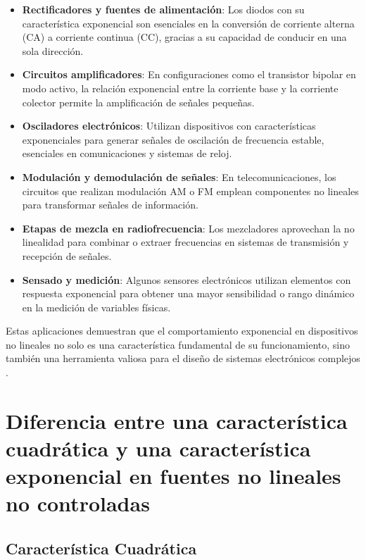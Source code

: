 \begin{itemize}
    \item \textbf{Rectificadores y fuentes de alimentación}: Los diodos con su característica exponencial son esenciales en la conversión de corriente alterna (CA) a corriente continua (CC), gracias a su capacidad de conducir en una sola dirección.
    
    \item \textbf{Circuitos amplificadores}: En configuraciones como el transistor bipolar en modo activo, la relación exponencial entre la corriente base y la corriente colector permite la amplificación de señales pequeñas.
    
    \item \textbf{Osciladores electrónicos}: Utilizan dispositivos con características exponenciales para generar señales de oscilación de frecuencia estable, esenciales en comunicaciones y sistemas de reloj.
    
    \item \textbf{Modulación y demodulación de señales}: En telecomunicaciones, los circuitos que realizan modulación AM o FM emplean componentes no lineales para transformar señales de información.
    
    \item \textbf{Etapas de mezcla en radiofrecuencia}: Los mezcladores aprovechan la no linealidad para combinar o extraer frecuencias en sistemas de transmisión y recepción de señales.
    
    \item \textbf{Sensado y medición}: Algunos sensores electrónicos utilizan elementos con respuesta exponencial para obtener una mayor sensibilidad o rango dinámico en la medición de variables físicas.
\end{itemize}

Estas aplicaciones demuestran que el comportamiento exponencial en dispositivos no lineales no solo es una característica fundamental de su funcionamiento, sino también una herramienta valiosa para el diseño de sistemas electrónicos complejos \cite{sedra_smith}.



\section{Diferencia entre una característica cuadrática y una característica exponencial en fuentes no lineales no controladas}

\subsection{Característica Cuadrática}

